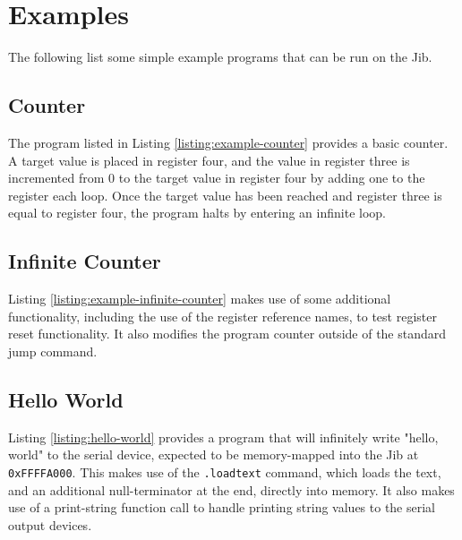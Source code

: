 \documentclass{article}
\begin{document}
\pagebreak

\section{Examples}

The following list some simple example programs that can be run on the Jib.

\subsection{Counter}

The program listed in Listing \ref{listing:example-counter} provides a basic counter. A target value is placed in register four, and the value in register three is incremented from 0 to the target value in register four by adding one to the register each loop. Once the target value has been reached and register three is equal to register four, the program halts by entering an infinite loop.



\pagebreak
\subsection{Infinite Counter}

Listing \ref{listing:example-infinite-counter} makes use of some additional functionality, including the use of the register reference names, to test register reset functionality. It also modifies the program counter outside of the standard jump command.



\subsection{Hello World}

Listing  \ref{listing:hello-world} provides a program that will infinitely write "hello, world" to the serial device, expected to be memory-mapped into the Jib at \texttt{0xFFFFA000}. This makes use of the \texttt{.loadtext} command, which loads the text, and an additional null-terminator at the end, directly into memory. It also makes use of a print-string function call to handle printing string values to the serial output devices.
\end{document}
